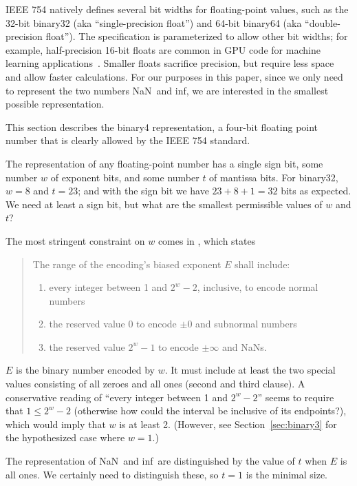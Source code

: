 \documentclass[twocolumn,cm]{article}
\newcommand\nan{\textsf{NaN}}
\renewcommand\inf{\textsf{inf}}
\newcommand\plusminus{\pm}
\begin{document}
IEEE 754 natively defines several bit widths for floating-point
values, such as the 32-bit binary32 (aka ``single-precision float'')
and 64-bit binary64 (aka ``double-precision float''). The
specification is parameterized to allow other bit widths; for example,
half-precision 16-bit floats are common in GPU code for machine
learning applications~\cite{wikipedia16}. Smaller floats sacrifice precision,
but require less space and allow faster calculations. For our purposes
in this paper, since we only need to represent the two numbers \nan\ and
\inf, we are interested in the smallest possible representation. 

This section describes the binary4 representation, a four-bit floating
point number that is clearly allowed by the IEEE 754 standard.

The representation of any floating-point number has a single sign bit,
some number $w$ of exponent bits, and some number $t$ of mantissa
bits. For binary32, $w = 8$ and $t = 23$; and with the sign bit we
have $23 + 8 + 1 = 32$ bits as expected. We need at least a sign bit,
but what are the smallest permissible values of $w$ and $t$?

The most stringent constraint on $w$ comes in , which
states
\begin{quote}
  The range of the encoding's biased exponent $E$ shall include:
  \begin{enumerate}[label=---]
    \item every integer between 1 and $2^w - 2$, inclusive, to encode
      normal numbers
    \item the reserved value 0 to encode $\plusminus 0$ and subnormal
      numbers
    \item the reserved value $2^w - 1$ to encode $\plusminus \infty$
      and NaNs.
  \end{enumerate}
\end{quote}

$E$ is the binary number encoded by $w$. It must include at least the
two special values consisting of all zeroes and all ones (second and
third clause). A conservative reading of ``every integer between 1 and
$2^w - 2$'' seems to require that $1 \leq 2^w - 2$ (otherwise how
could the interval be inclusive of its endpoints?), which would imply
that $w$ is at least 2. (However, see Section~\ref{sec:binary3} for
the hypothesized case where $w=1$.)

The representation of \nan\ and \inf\ are distinguished by the value
of $t$ when $E$ is all ones. We certainly need to distinguish these,
so $t = 1$ is the minimal size.
\end{document}
